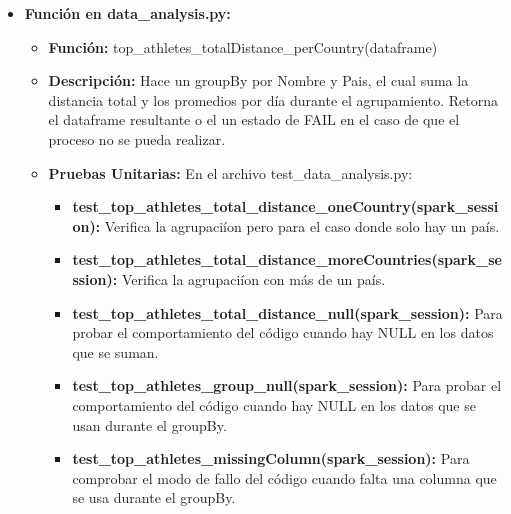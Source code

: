 \documentclass[a4paper]{article}
\begin{document}
\begin{itemize}
    \item \textbf{Funci\'{o}n en data\_analysis.py:}
        \begin{itemize}
            \item \textbf{Funci\'{o}n:} top\_athletes\_totalDistance\_perCountry(dataframe)
            \item \textbf{Descripci\'{o}n:} Hace un groupBy por Nombre y Pais, el cual suma la distancia total y los promedios por d\'{i}a durante el agrupamiento. Retorna el dataframe resultante o el un estado de FAIL en el caso de que el proceso no se pueda realizar.
            \item \textbf{Pruebas Unitarias:} En el archivo test\_data\_analysis.py:
                \begin{itemize}
                    \item \textbf{test\_top\_athletes\_total\_distance\_oneCountry(spark\_session):} Verifica la agrupaci\'{i}on pero para el caso donde solo hay un pa\'{i}s.
                    \item \textbf{test\_top\_athletes\_total\_distance\_moreCountries(spark\_session):} Verifica la agrupaci\'{i}on con m\'{a}s de un pa\'{i}s.
                    \item \textbf{test\_top\_athletes\_total\_distance\_null(spark\_session):} Para probar el comportamiento del c\'{o}digo cuando hay NULL en los datos que se suman.
                    \item \textbf{test\_top\_athletes\_group\_null(spark\_session):} Para probar el comportamiento del c\'{o}digo cuando hay NULL en los datos que se usan durante el groupBy.
                    \item \textbf{test\_top\_athletes\_missingColumn(spark\_session):} Para comprobar el modo de fallo del c\'{o}digo cuando falta una columna que se usa durante el groupBy.
                \end{itemize}
        \end{itemize}
    
\end{itemize}
\end{document}
